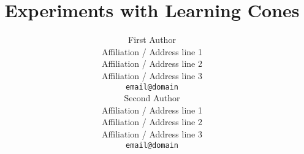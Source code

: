 \documentclass[11pt]{article}
\title{Experiments with Learning Cones}
\author{First Author \\
  Affiliation / Address line 1 \\
  Affiliation / Address line 2 \\
  Affiliation / Address line 3 \\
  {\tt email@domain} \\\And
  Second Author \\
  Affiliation / Address line 1 \\
  Affiliation / Address line 2 \\
  Affiliation / Address line 3 \\
  {\tt email@domain} \\}
\date{}
\begin{document}
\maketitle

\begin{abstract}

\end{abstract}














\newpage



\end{document}

